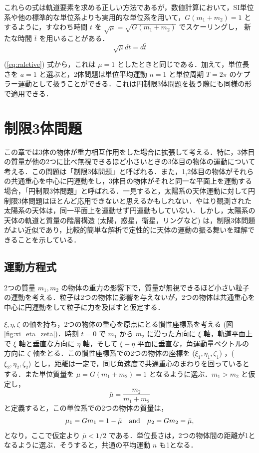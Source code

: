 \documentclass[11pt,a4paper,oneside,onecolumn]{jarticle}
\begin{document}
これらの式は軌道要素を求める正しい方法であるが，数値計算において，SI単位系や他の標準的な単位系よりも実用的な単位系を用いて，$G (m_1 + m_2) = 1$ とするように，すなわち時間 $t$ を $\sqrt{\mu} = \sqrt{G (m_1 + m_2)}$ でスケーリングし， 新たな時間 $\bar{t}$ を用いることがある．
\begin{equation}
\sqrt{\mu} dt = d \bar{t} \label{eq:tbar}
\end{equation}

(\ref{eq:raletive}) 式から，これは $\mu = 1$ としたときと同じである．加えて，単位長さを $a = 1$ と選ぶと，2体問題は単位平均運動 $n = 1$ と単位周期 $T = 2 \pi$ のケプラー運動として扱うことができる．これは円制限3体問題を扱う際にも同様の形で適用できる．


\section{制限3体問題}
この章では3体の物体が重力相互作用をした場合に拡張して考える．特に，3体目の質量が他の2つに比べ無視できるほど小さいときの3体目の物体の運動について考える．この問題は「制限3体問題」と呼ばれる．また，1,2体目の物体がそれらの共通重心を中心に円運動をし，3体目の物体がそれと同一な平面上を運動する場合，「円制限3体問題」と呼ばれる．一見すると，太陽系の天体運動に対して円制限3体問題はほとんど応用できないと思えるかもしれない．やはり観測された太陽系の天体は，同一平面上を運動せず円運動もしていない．しかし，太陽系の天体の軌道と質量の階層構造 (太陽，惑星，衛星，リングなど) は，制限3体問題がよい近似であり，比較的簡単な解析で定性的に天体の運動の振る舞いを理解できることを示している．

\subsection{運動方程式}
2つの質量 $m_1, m_2$ の物体の重力の影響下で，質量が無視できるほど小さい粒子の運動を考える．粒子は2つの物体に影響を与えないが，2つの物体は共通重心を中心に円運動をして粒子に力を及ぼすと仮定する．

$\xi, \eta, \zeta$ の軸を持ち，2つの物体の重心を原点にとる慣性座標系を考える (図 \ref{fig:xi_eta_zeta})．時刻 $t = 0$ で $m_1$ から $m_2$ に沿った方向に $\xi$ 軸，軌道平面上で $\xi$ 軸と垂直な方向に $\eta$ 軸，そして $\xi - \eta$ 平面に垂直な，角運動量ベクトルの方向に $\zeta$ 軸をとる．この慣性座標系での2つの物体の座標を ($\xi_1, \eta_1, \zeta_1$) ，($\xi_2, \eta_2, \zeta_2$) とし，距離は一定で，同じ角速度で共通重心のまわりを回っているとする．また単位質量を $\mu = G (m_1 + m_2) = 1$ となるように選ぶ．$m_1 > m_2$ と仮定し，
\begin{equation}
\bar{\mu} = \frac{m_2}{m_1 + m_2}
\end{equation}
と定義すると，この単位系での2つの物体の質量は，
\begin{equation}
\mu_1 = G m_1 = 1 - \bar{\mu} \quad {\rm and} \quad \mu_2 = G m_2 = \bar{\mu}, \label{eq:mu1mu2}
\end{equation}
となり，ここで仮定より $\bar{\mu} < 1/2$ である．単位長さは，2つの物体間の距離が1となるように選ぶ．そうすると，共通の平均運動 $n$ も1となる．
\end{document}
